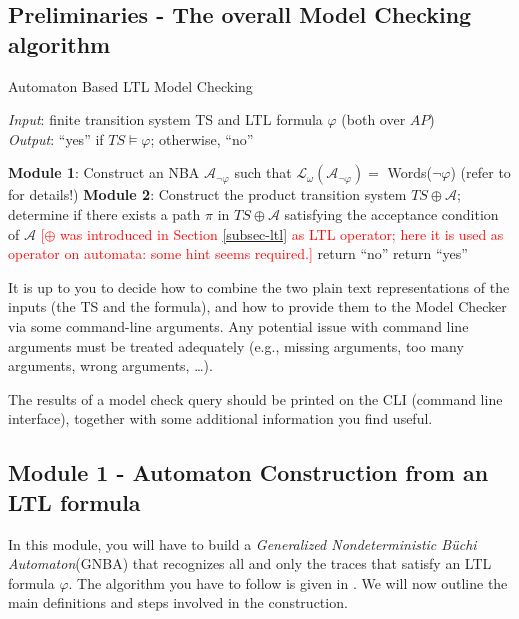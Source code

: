 \documentclass{article}
\begin{document}
\subsection{Preliminaries - The overall Model Checking algorithm}
\label{subsec-mca}
\begin{algorithm}[H]
    \caption{Automaton Based LTL Model Checking}
    \label{alg:mc}
    \hspace*{\algorithmicindent} \emph{Input}: finite transition system TS and LTL formula $\varphi$ (both over $AP$) \\
    \hspace*{\algorithmicindent} \emph{Output}: ``yes'' if $TS \vDash \varphi$; otherwise, ``no''
    \begin{algorithmic}[1]
    \State \textbf{Module 1}: Construct an NBA $\mathcal{A}_{\neg \varphi}$ such that $\mathcal{L}_{\omega}(\mathcal{A}_{\neg \varphi}) = $ Words($\neg \varphi$) (refer to \cite{BaKa} for details!)
    \State \textbf{Module 2}: Construct the product transition system $TS \oplus \mathcal{A}$; determine if there exists 
                a path $\pi$ in $TS \oplus \mathcal{A}$ satisfying the acceptance condition of $\mathcal{A}$
            \textcolor{red}{[$\oplus$ was introduced in Section \ref{subsec-ltl} as LTL operator; here it is
            used as operator on automata: some hint seems required.]}
        \State return ``no'' 
    \Else 
        \State return ``yes''
    \EndIf
    \end{algorithmic}
\end{algorithm}
  
It is up to you to decide how to combine the two plain text representations of the inputs (the TS and the formula), 
and how to provide them to the Model Checker via some command-line arguments. Any potential issue with 
command line arguments must be treated adequately (e.g., missing arguments, too many arguments, wrong arguments, \dots).

The results of a model check query should be printed on the CLI (command line interface), together with some additional 
information you find useful.

\subsection{Module 1 - Automaton Construction from an LTL formula}
\label{subsec-m1}
In this module, you will have to build a \emph{Generalized Nondeterministic Büchi Automaton}(GNBA) 
that recognizes all and only the traces that satisfy an LTL formula $\varphi$. The algorithm you have to follow 
is given in \cite[Section 5.2]{BaKa}. 
We will now outline the main definitions and steps involved in the construction.
\end{document}
